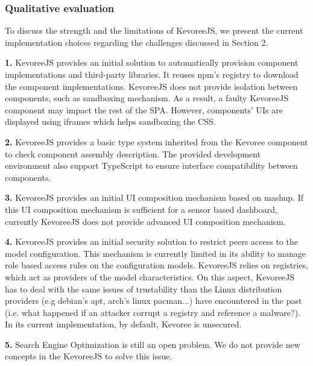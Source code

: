 
\subsubsection{Qualitative evaluation  }
To discuss the strength and the limitations of KevoreeJS, we present the current implementation choices regarding the challenges discussed in Section 2.

\indent \textbf{1.} KevoreeJS provides an initial solution to automatically provision component implementations and third-party libraries. It reuses npm's registry to download the component implementations. KevoreeJS does not provide isolation between components, such as sandboxing mechanism. As a result, a faulty KevoreeJS component may impact the rest of the SPA. However, components' UIs are displayed using iframes which helps sandboxing the CSS.

\indent \textbf{2.} KevoreeJS provides a basic type system inherited from the Kevoree component to check component assembly description. The provided development environment also support TypeScript to ensure interface compatibility between components.

\indent \textbf{3.} KevoreeJS provides an initial UI composition mechanism based on mashup. If this UI composition mechanism is sufficient for a sensor based dashboard, currently KevoreeJS does not provide advanced UI composition mechanism.

\indent \textbf{4.} KevoreeJS provides an initial security solution to restrict peers access to the model configuration. This mechanism is currently limited in its ability to manage role based access rules on the configuration models. KevoreeJS relies on registries, which act as providers of the model characteristics. On this aspect, KevoreeJS has to deal with the same issues of trustability than the Linux distribution providers (e.g debian's apt, arch's linux pacman...) have encountered in the past (i.e. what happened if an attacker corrupt a registry and reference a malware?).  In its current implementation, by default, Kevoree is unsecured.

\indent \textbf{5.} Search Engine Optimization is still an open problem. We do not provide new concepts in the KevoreeJS to solve this issue.

